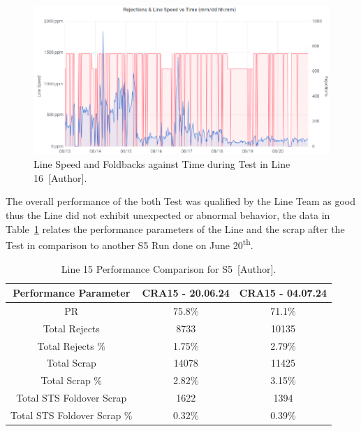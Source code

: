 \begin{figure}[H]
    \centering
    \includegraphics[width=1\linewidth]{FIGURES/L16_Test.png}
    \caption{Line Speed and Foldbacks against Time during Test in Line 16~[Author].}
    \label{L16_Test}
\end{figure}

The overall performance of the both Test was qualified by the Line Team as good thus the Line did not exhibit unexpected or abnormal behavior, the data in Table~\ref{PR15} relates the performance parameters of the Line and the scrap after the Test in comparison to another S5 Run done on June 20\textsuperscript{th}.

\begin{table}[H]
\centering
\scriptsize
\begin{tabular}{ccc}
\hline
\textbf{Performance Parameter}          & \textbf{CRA15 - 20.06.24} & \textbf{CRA15 - 04.07.24} \\ \hline
PR                             & 75.8\%           & 71.1\%          \\
Total Rejects                  & 8733             & 10135           \\
Total Rejects \%              & 1.75\%           & 2.79\%          \\
Total Scrap                    & 14078            & 11425           \\
Total Scrap \%                & 2.82\%           & 3.15\%          \\
Total STS Foldover Scrap     & 1622             & 1394            \\
Total STS Foldover Scrap \% & 0.32\%           & 0.39\%          \\ \hline
\end{tabular}%
\caption{Line 15 Performance Comparison for S5~[Author].}
\label{PR15}
\end{table}